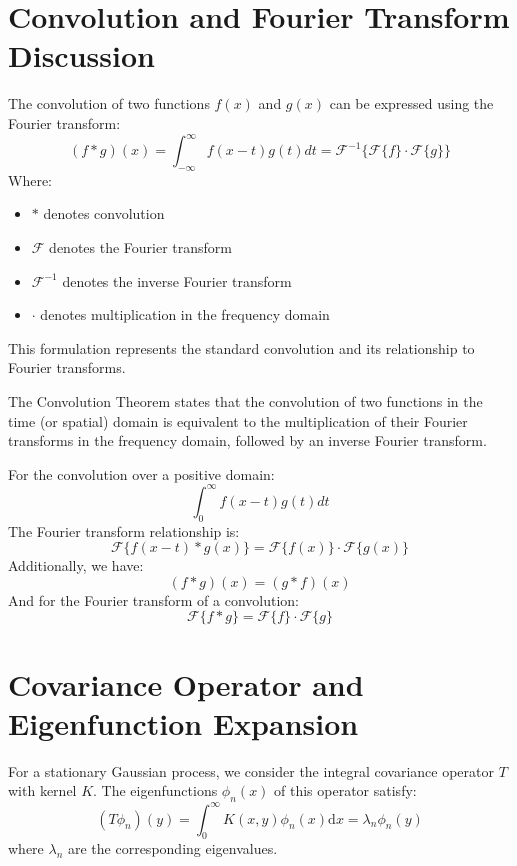 \documentclass{article}
\newcommand{\mathd}{\mathrm{d}}
\begin{document}
\section{Convolution and Fourier Transform Discussion}

The convolution of two functions $f (x)$ and $g (x)$ can be expressed using
the Fourier transform:
\[ (f \ast g) (x) = \int_{- \infty}^{\infty} f (x - t) g (t) dt
   =\mathcal{F}^{- 1}  \{\mathcal{F}\{f\} \cdot \mathcal{F}\{g\}\} \]
Where:
\begin{itemize}
  \item $\ast$ denotes convolution
  
  \item $\mathcal{F}$ denotes the Fourier transform
  
  \item $\mathcal{F}^{- 1}$ denotes the inverse Fourier transform
  
  \item $\cdot$ denotes multiplication in the frequency domain
\end{itemize}
This formulation represents the standard convolution and its relationship to
Fourier transforms.

The Convolution Theorem states that the convolution of two functions in the
time (or spatial) domain is equivalent to the multiplication of their Fourier
transforms in the frequency domain, followed by an inverse Fourier transform.

For the convolution over a positive domain:
\[ \int_0^{\infty} f (x - t) g (t) dt \]
The Fourier transform relationship is:
\[ \mathcal{F} \{f (x - t) \ast g (x)\} =\mathcal{F} \{f (x)\} \cdot
   \mathcal{F} \{g (x)\} \]
Additionally, we have:
\[ (f \ast g) (x) = (g \ast f) (x) \]
And for the Fourier transform of a convolution:
\[ \mathcal{F} \{f \ast g\} =\mathcal{F} \{f\} \cdot \mathcal{F} \{g\} \]

\section{Covariance Operator and Eigenfunction Expansion}

For a stationary Gaussian process, we consider the integral covariance
operator $T$ with kernel $K$. The eigenfunctions $\phi_n (x)$ of this operator
satisfy:
\begin{equation}
  (T \phi_n) (y) = \int_0^{\infty} K (x, y) \phi_n (x) \mathd x = \lambda_n
  \phi_n (y)
\end{equation}
where $\lambda_n$ are the corresponding eigenvalues.
\end{document}
